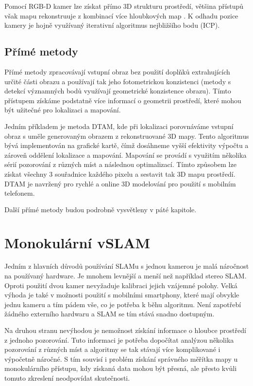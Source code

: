 \documentclass[12pt,a4paper]{report}
\begin{document}
Pomocí RGB-D kamer lze získat přímo 3D strukturu prostředí, většina přístupů však mapu rekonstruuje z kombinací více hloubkových map \cite{Taketomi_visual}. K odhadu pozice kamery je hojně využívaný iterativní algoritmus nejbližšího bodu (ICP). 

\subsection{Přímé metody}
Přímé metody zpracovávají vstupní obraz bez použití doplňků extrahujících určité části obrazu a používají tak jeho fotometrickou konzistenci (metody s detekcí významných bodů využívají geometrické konzistence obrazu). Tímto přístupem získáme podstatně více informací o geometrii prostředí, které mohou být užitečné pro lokalizaci a mapování.

Jedním příkladem je metoda DTAM, kde při lokalizaci porovnáváme vstupní obraz s uměle generovaným obrazem z rekonstruované 3D mapy. Tento algoritmus bývá implementován na grafické kartě, čímž dosáhneme vyšší efektivity výpočtu a zároveň oddělení lokalizace a mapování. Mapování se provádí s využitím několika sérií pozorování z různých míst a následnou optimalizací. Tímto způsobem lze získat všechny 3 souřadnice každého pixelu a sestavit tak 3D mapu prostředí. DTAM je navržený pro rychlé a online 3D modelování pro použití s mobilním telefonem.

Další přímé metody budou podrobně vysvětleny v páté kapitole.

\section{Monokulární vSLAM}
Jedním z hlavních důvodů používání SLAMu s jednou kamerou je malá náročnost na používaný hardware. Je mnohem levnější a menší než například stereo SLAM. Oproti použití dvou kamer nevyžaduje kalibraci jejich vzájemné polohy. Velká výhoda je také v možnosti použití s mobilními smartphony, které mají obvykle jednu kameru a tím pádem vše, co je potřeba k běhu algoritmu. Není zapotřebí žádného externího hardwaru a SLAM se tím stává snadno dostupným.

Na druhou stranu nevýhodou je nemožnost získání informace o hloubce prostředí z jednoho pozorování. Tuto informaci je potřeba dopočítat analýzou několika pozorování z různých míst a algoritmy se tak stávají více komplikované i výpočetně náročné. S tím souvisí i problém získání správného měřítka mapy u monokulárního přístupu, kdy získaná data mohou být přesná, ale přesto kvůli tomuto zkreslení neodpovídat skutečnosti.
\end{document}
